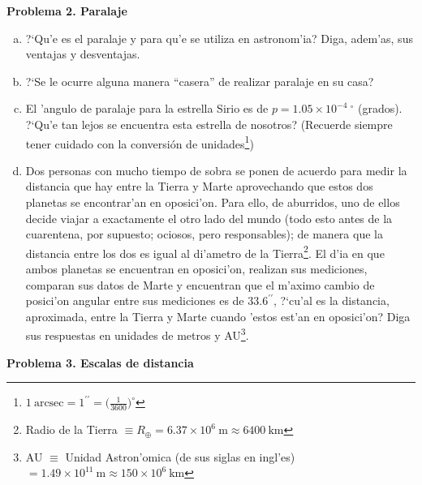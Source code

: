 \documentclass{article}
\begin{document}
\vspace{3mm}

\textbf{Problema 2. Paralaje}

\begin{enumerate} [a)]

\item ?`Qu'e es el paralaje y para qu'e se utiliza en astronom'ia? Diga, adem'as, sus ventajas y desventajas.
\item ?`Se le ocurre alguna manera ``casera'' de realizar paralaje en su casa?
\item El 'angulo de paralaje para la estrella Sirio es de $p = 1.05 \times 10^{-4} \ ^{\circ}$ (grados). ?`Qu'e tan lejos se encuentra esta estrella de nosotros? (Recuerde siempre tener cuidado con la conversión de unidades\footnote{$1 \ \text{arcsec} = 1^{\prime \prime} = \Big(\frac{1}{3600}\Big)^{\circ}$})
\item Dos personas con mucho tiempo de sobra se ponen de acuerdo para medir la distancia que hay entre la Tierra y Marte aprovechando que estos dos planetas se encontrar'an en oposici'on. Para ello, de aburridos, uno de ellos decide viajar a exactamente el otro lado del mundo (todo esto antes de la cuarentena, por supuesto; ociosos, pero responsables); de manera que la distancia entre los dos es igual al di'ametro de la Tierra\footnote{Radio de la Tierra $\equiv R_{\oplus} = 6.37 \times 10^{6} \ \text{m} \approx 6400 \ \text{km}$ }. El d'ia en que ambos planetas se encuentran en oposici'on, realizan sus mediciones, comparan sus datos de Marte y encuentran que el m'aximo cambio de posici'on angular entre sus mediciones es de $33.6^{\prime \prime}$, ?`cu'al es la distancia, aproximada, entre la Tierra y Marte cuando 'estos est'an en oposici'on? Diga sus respuestas en unidades de metros y AU\footnote{AU $\equiv$ Unidad Astron'omica (de sus siglas en ingl'es) $ = 1.49 \times 10^{11} \ \text{m} \approx 150 \times 10^{6} \ \text{km}$}.
\end{enumerate}

\vspace{4mm}

\textbf{Problema 3. Escalas de distancia}

\vspace{2mm}
\end{document}
